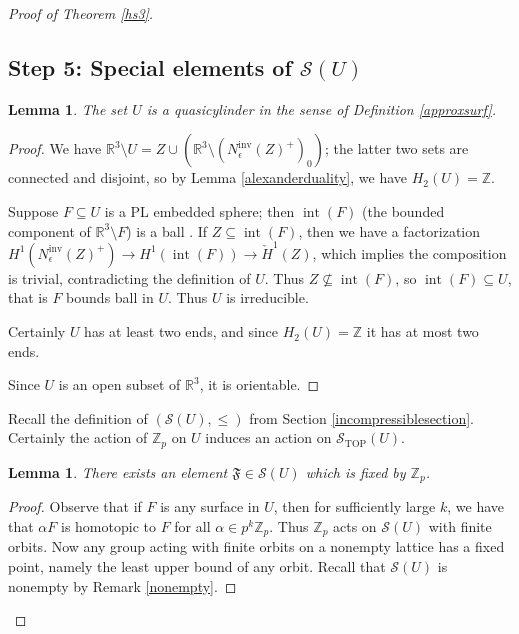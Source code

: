 \documentclass[12pt]{article}
\theoremstyle{plain}
\newtheorem{lemma}[theorem]{Lemma}
\theoremstyle{definition}
\theoremstyle{remark}
\numberwithin{equation}{section}
\begin{document}
\begin{proof}[Proof of Theorem \ref{hs3}]
\subsection{Step 5: Special elements of $\mathcal S(U)$}

\begin{lemma}
The set $U$ is a quasicylinder in the sense of Definition \ref{approxsurf}.
\end{lemma}

\begin{proof}
We have $\mathbb R^3\setminus U=Z\cup(\mathbb R^3\setminus(N^{\operatorname{inv}}_\epsilon(Z)^+)_0)$; the latter two sets are connected and disjoint, so by Lemma \ref{alexanderduality}, we have $H_2(U)=\mathbb Z$.

Suppose $F\subseteq U$ is a PL embedded sphere; then $\operatorname{int}(F)$ (the bounded component of $\mathbb R^3\setminus F$) is a ball \cite{alexander}.  If $Z\subseteq\operatorname{int}(F)$, then we have a factorization $H^1(N^{\operatorname{inv}}_\epsilon(Z)^+)\to H^1(\operatorname{int}(F))\to\check H^1(Z)$, which implies the composition is trivial, contradicting the definition of $U$.  Thus $Z\nsubseteq\operatorname{int}(F)$, so $\operatorname{int}(F)\subseteq U$, that is $F$ bounds ball in $U$.  Thus $U$ is irreducible.

Certainly $U$ has at least two ends, and since $H_2(U)=\mathbb Z$ it has at most two ends.

Since $U$ is an open subset of $\mathbb R^3$, it is orientable.
\end{proof}

Recall the definition of $(\mathcal S(U),\leq)$ from Section \ref{incompressiblesection}.  Certainly the action of $\mathbb Z_p$ on $U$ induces an action on $\mathcal S_{\operatorname{TOP}}(U)$.

\begin{lemma}\label{fixedsurface}
There exists an element $\mathfrak F\in\mathcal S(U)$ which is fixed by $\mathbb Z_p$.
\end{lemma}

\begin{proof}
Observe that if $F$ is any surface in $U$, then for sufficiently large $k$, we have that $\alpha F$ is homotopic to $F$ for all $\alpha\in p^k\mathbb Z_p$.  Thus $\mathbb Z_p$ acts on $\mathcal S(U)$ with finite orbits.  Now any group acting with finite orbits on a nonempty lattice has a fixed point, namely the least upper bound of any orbit.  Recall that $\mathcal S(U)$ is nonempty by Remark \ref{nonempty}.
\end{proof}


\end{proof}
\end{document}
